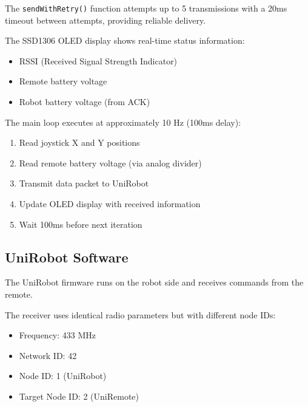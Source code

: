 The \texttt{sendWithRetry()} function attempts up to 5 transmissions with a 20ms timeout between attempts, providing reliable delivery.


The SSD1306 OLED display shows real-time status information:
\begin{itemize}
    \item RSSI (Received Signal Strength Indicator)
    \item Remote battery voltage
    \item Robot battery voltage (from ACK)
\end{itemize}


The main loop executes at approximately 10 Hz (100ms delay):

\begin{enumerate}
    \item Read joystick X and Y positions
    \item Read remote battery voltage (via analog divider)
    \item Transmit data packet to UniRobot
    \item Update OLED display with received information
    \item Wait 100ms before next iteration
\end{enumerate}

\subsection{UniRobot Software}

The UniRobot firmware runs on the robot side and receives commands from the remote.


The receiver uses identical radio parameters but with different node IDs:
\begin{itemize}
    \item Frequency: 433 MHz
    \item Network ID: 42
    \item Node ID: 1 (UniRobot)
    \item Target Node ID: 2 (UniRemote)
\end{itemize}


